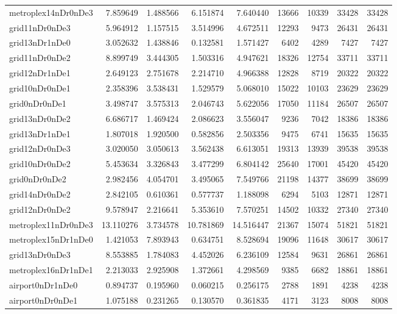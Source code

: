 \begin{longtable}{|l|r|r|r|r|r|r|r|r|}
metroplex14nDr0nDe3 & 7.859649 & 1.488566 & 6.151874 & 7.640440 & 13666 & 10339 & 33428 & 33428 \\
grid11nDr0nDe3 & 5.964912 & 1.157515 & 3.514996 & 4.672511 & 12293 & 9473 & 26431 & 26431 \\
grid13nDr1nDe0 & 3.052632 & 1.438846 & 0.132581 & 1.571427 & 6402 & 4289 & 7427 & 7427 \\
grid11nDr0nDe2 & 8.899749 & 3.444305 & 1.503316 & 4.947621 & 18326 & 12754 & 33711 & 33711 \\
grid12nDr1nDe1 & 2.649123 & 2.751678 & 2.214710 & 4.966388 & 12828 & 8719 & 20322 & 20322 \\
grid10nDr0nDe1 & 2.358396 & 3.538431 & 1.529579 & 5.068010 & 15022 & 10103 & 23629 & 23629 \\
grid0nDr0nDe1 & 3.498747 & 3.575313 & 2.046743 & 5.622056 & 17050 & 11184 & 26507 & 26507 \\
grid13nDr0nDe2 & 6.686717 & 1.469424 & 2.086623 & 3.556047 & 9236 & 7042 & 18386 & 18386 \\
grid13nDr1nDe1 & 1.807018 & 1.920500 & 0.582856 & 2.503356 & 9475 & 6741 & 15635 & 15635 \\
grid12nDr0nDe3 & 3.020050 & 3.050613 & 3.562438 & 6.613051 & 19313 & 13939 & 39538 & 39538 \\
grid10nDr0nDe2 & 5.453634 & 3.326843 & 3.477299 & 6.804142 & 25640 & 17001 & 45420 & 45420 \\
grid0nDr0nDe2 & 2.982456 & 4.054701 & 3.495065 & 7.549766 & 21198 & 14377 & 38699 & 38699 \\
grid14nDr0nDe2 & 2.842105 & 0.610361 & 0.577737 & 1.188098 & 6294 & 5103 & 12871 & 12871 \\
grid12nDr0nDe2 & 9.578947 & 2.216641 & 5.353610 & 7.570251 & 14502 & 10332 & 27340 & 27340 \\
metroplex11nDr0nDe3 & 13.110276 & 3.734578 & 10.781869 & 14.516447 & 21367 & 15074 & 51821 & 51821 \\
metroplex15nDr1nDe0 & 1.421053 & 7.893943 & 0.634751 & 8.528694 & 19096 & 11648 & 30617 & 30617 \\
grid13nDr0nDe3 & 8.553885 & 1.784083 & 4.452026 & 6.236109 & 12584 & 9631 & 26861 & 26861 \\
metroplex16nDr1nDe1 & 2.213033 & 2.925908 & 1.372661 & 4.298569 & 9385 & 6682 & 18861 & 18861 \\
airport0nDr1nDe0 & 0.894737 & 0.195960 & 0.060215 & 0.256175 & 2788 & 1891 & 4238 & 4238 \\
airport0nDr0nDe1 & 1.075188 & 0.231265 & 0.130570 & 0.361835 & 4171 & 3123 & 8008 & 8008 \\

\end{longtable}
